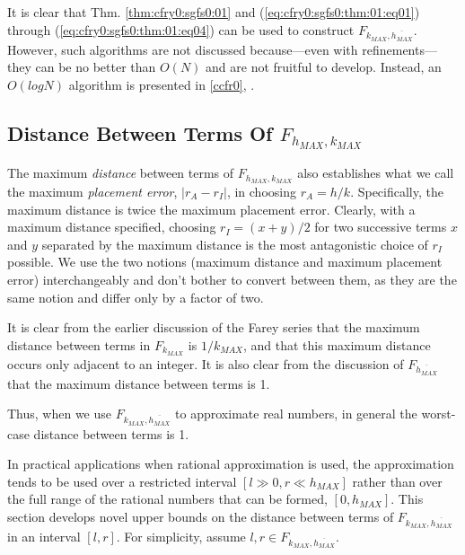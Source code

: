 \vworkexamplefooter{}

It is clear that Thm. \ref{thm:cfry0:sgfs0:01}
and (\ref{eq:cfry0:sgfs0:thm:01:eq01}) through
(\ref{eq:cfry0:sgfs0:thm:01:eq04}) can be used to construct
$F_{k_{MAX}, \overline{h_{MAX}}}$.  However, such algorithms
are not discussed because---even with refinements---they
can be no better than $O(N)$ and are not
fruitful to develop.  Instead, an $O(log N)$
algorithm is presented in 
\ccfrzeroxrefcomma{}\ccfrzeromcclass{} \ref{ccfr0}, 
\emph{\ccfrzeroshorttitle{}}.


\subsection[Distance Between Terms Of $F_{h_{MAX},k_{MAX}}$]
           {Distance Between Terms Of \mbox{\boldmath $F_{h_{MAX},k_{MAX}}$}}

The maximum \emph{distance} between terms of $F_{h_{MAX},k_{MAX}}$ also establishes
what we call the maximum \emph{placement error}, $|r_A - r_I|$, in choosing
$r_A = h/k$.  Specifically, the maximum distance is twice the maximum placement
error.  Clearly, with a maximum distance specified, choosing $r_I = (x+y)/2$ for
two successive terms $x$ and $y$ separated by the maximum distance is 
the most antagonistic
choice of $r_I$ possible.
We use the two notions (maximum distance and maximum placement error)
interchangeably and don't bother to convert between them, as they are
the same notion and differ only by a factor of two.

It is clear from the earlier discussion of the Farey series that the maximum
distance between terms in $F_{k_{MAX}}$ is $1/k_{MAX}$, and that this maximum
distance occurs only adjacent to an integer.  It is also clear from the
discussion of $F_{\overline{h_{MAX}}}$ that the maximum distance between terms
is 1.

Thus, when we use $F_{k_{MAX}, \overline{h_{MAX}}}$ to approximate real numbers,
in general the worst-case distance between terms is 1.

In practical applications when rational approximation is used,
the approximation tends to be used over a restricted interval
$[l \gg  0, r \ll h_{MAX}]$ rather than over the full range of the rational numbers that
can be formed, $[0, h_{MAX}]$.  This section develops novel upper bounds on
the distance between terms of $F_{k_{MAX}, \overline{h_{MAX}}}$ in an interval
$[l,r]$.  For simplicity, assume $l,r \in F_{k_{MAX}, \overline{h_{MAX}}}$.

